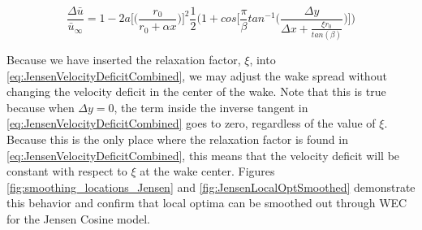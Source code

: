 \documentclass[a4paper]{jpconf}
\begin{document}



\begin{equation}
\frac{\Delta \bar{u}}{\bar{u}_\infty} = 1 - 2a \Bigg[  \bigg(\frac{r_0}{r_0 + \alpha x} \bigg) \Bigg]^2 \frac{1}{2} \Bigg(1 + cos\Bigg[\frac{\pi}{\beta} tan^{-1}\Bigg(\frac{\Delta y}{\Delta x + \frac{\xi r_0}{tan(\beta)}} \Bigg) \Bigg] \Bigg)
\label{eq:JensenVelocityDeficitCombined}
\end{equation}

Because we have inserted the relaxation factor, $\xi$, into \cref{eq:JensenVelocityDeficitCombined}, we may adjust the wake spread without changing the velocity deficit in the center of the wake. Note that this is true because when $\Delta y = 0$, the term inside the inverse tangent in \cref{eq:JensenVelocityDeficitCombined} goes to zero, regardless of the value of $\xi$. Because this is the only place where the relaxation factor is found in \cref{eq:JensenVelocityDeficitCombined}, this means that the velocity deficit will be constant with respect to $\xi$ at the wake center. Figures \ref{fig:smoothing_locations_Jensen} and \ref{fig:JensenLocalOptSmoothed} demonstrate this behavior and confirm that local optima can be smoothed out through WEC for the Jensen Cosine model.
\end{document}
